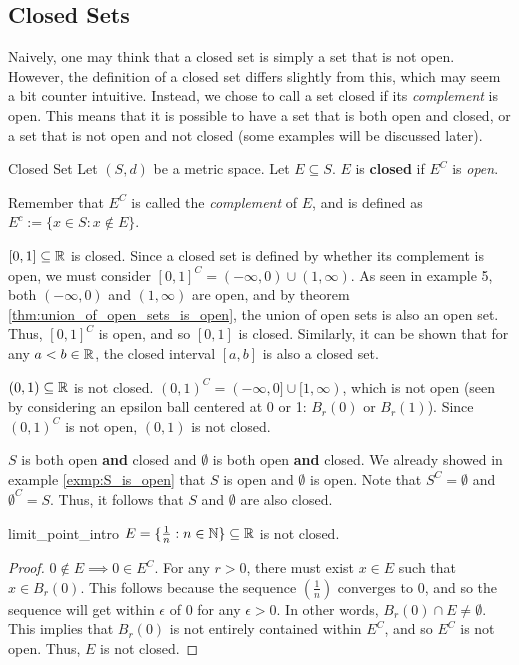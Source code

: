 \subsection{Closed Sets}
Naively, one may think that a closed set is simply a set that is not open. However, the definition of a closed set differs slightly from this, which may seem a bit counter intuitive. Instead, we chose to call a set closed if its \textit{complement} is open. This means that it is possible to have a set that is both open and closed, or a set that is not open and not closed (some examples will be discussed later).
\newline

\begin{defn}{Closed Set}{}
Let \((S, d)\) be a metric space. Let \(E \subseteq S\). \newline 
\(E\) is \textbf{closed} if \(E^C\) is \textit{open}.
\newline 

Remember that \(E^C\) is called the \textit{complement} of \(E\), and is defined as \(E^c := \{x \in S : x \not \in E\}\).
\end{defn}
\begin{exmp}{}{}
\([0, 1] \subseteq {\mathbb R}\) is closed. Since a closed set is defined by whether its complement is open, we must consider \([0,1]^C = (- \infty, 0) \cup (1,  \infty)\). As seen in example 5, both \((- \infty, 0)\) and \((1, \infty)\) are open, and by theorem \ref{thm:union_of_open_sets_is_open}, the union of open sets is also an open set. Thus, \([0,1]^C\) is open, and so \([0,1]\) is closed. Similarly, it can be shown that for any \(a<b \in {\mathbb R}\), the closed interval \([a,b]\) is also a closed set.
\end{exmp}
\begin{exmp}{}{}
\((0, 1) \subseteq {\mathbb R}\) is not closed. \((0, 1)^C = (-\infty, 0] \cup [1, \infty)\), which is not open (seen by considering an epsilon ball centered at 0 or 1: \(B_r(0)\) or \(B_r(1)\)). Since \((0, 1)^C\) is not open, \((0, 1)\) is not closed.
\end{exmp}
\begin{exmp}{}{}
\(S\) is both open \textbf{and} closed and \(\emptyset\) is both open \textbf{and} closed. We already showed in example \ref{exmp:S_is_open} that \(S\) is open and \(\emptyset\) is open. Note that \(S^C = \emptyset\) and \(\emptyset^C = S\). Thus, it follows that \(S\) and \(\emptyset\) are also closed.
\end{exmp}
\begin{exmp}{}{limit_point_intro}
\(E = \{ \frac{1}{n} : n \in {\mathbb N} \} \subseteq {\mathbb R}\) is not closed. \begin{proof}
\(0 \not \in E \implies 0 \in E^C\). For any \(r > 0\), there must exist \(x \in E\) such that \(x \in B_r(0)\). This follows because the sequence \((\frac{1}{n})\) converges to 0, and so the sequence will get within \(\epsilon\) of 0 for any \(\epsilon > 0\). In other words, \(B_r(0) \cap E \not = \emptyset\). This implies that \(B_r(0)\) is not entirely contained within \(E^C\), and so \(E^C\) is not open. Thus, \(E\) is not closed.
\end{proof}

\end{exmp}
